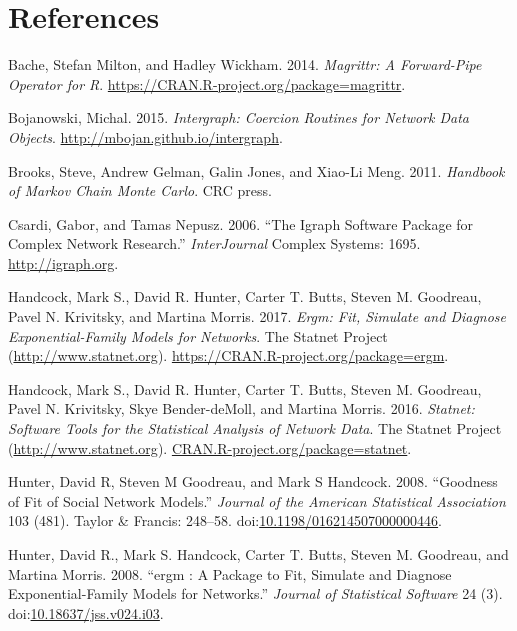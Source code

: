 \documentclass[]{book}
\theoremstyle{definition}
\theoremstyle{definition}
\theoremstyle{definition}
\theoremstyle{remark}
\begin{document}


\chapter*{References}\label{references}

\hypertarget{refs}{}
\hypertarget{ref-R-magrittr}{}
Bache, Stefan Milton, and Hadley Wickham. 2014. \emph{Magrittr: A
Forward-Pipe Operator for R}.
\url{https://CRAN.R-project.org/package=magrittr}.

\hypertarget{ref-R-intergraph}{}
Bojanowski, Michal. 2015. \emph{Intergraph: Coercion Routines for
Network Data Objects}. \url{http://mbojan.github.io/intergraph}.

\hypertarget{ref-brooks2011}{}
Brooks, Steve, Andrew Gelman, Galin Jones, and Xiao-Li Meng. 2011.
\emph{Handbook of Markov Chain Monte Carlo}. CRC press.

\hypertarget{ref-R-igraph}{}
Csardi, Gabor, and Tamas Nepusz. 2006. ``The Igraph Software Package for
Complex Network Research.'' \emph{InterJournal} Complex Systems: 1695.
\url{http://igraph.org}.

\hypertarget{ref-R-ergm}{}
Handcock, Mark S., David R. Hunter, Carter T. Butts, Steven M. Goodreau,
Pavel N. Krivitsky, and Martina Morris. 2017. \emph{Ergm: Fit, Simulate
and Diagnose Exponential-Family Models for Networks}. The Statnet
Project (\url{http://www.statnet.org}).
\url{https://CRAN.R-project.org/package=ergm}.

\hypertarget{ref-R-statnet}{}
Handcock, Mark S., David R. Hunter, Carter T. Butts, Steven M. Goodreau,
Pavel N. Krivitsky, Skye Bender-deMoll, and Martina Morris. 2016.
\emph{Statnet: Software Tools for the Statistical Analysis of Network
Data}. The Statnet Project (\url{http://www.statnet.org}).
\url{CRAN.R-project.org/package=statnet}.

\hypertarget{ref-HunterJASA2008}{}
Hunter, David R, Steven M Goodreau, and Mark S Handcock. 2008.
``Goodness of Fit of Social Network Models.'' \emph{Journal of the
American Statistical Association} 103 (481). Taylor \& Francis: 248--58.
doi:\href{https://doi.org/10.1198/016214507000000446}{10.1198/016214507000000446}.

\hypertarget{ref-Hunter2008}{}
Hunter, David R., Mark S. Handcock, Carter T. Butts, Steven M. Goodreau,
and Martina Morris. 2008. ``ergm : A Package to Fit, Simulate and
Diagnose Exponential-Family Models for Networks.'' \emph{Journal of
Statistical Software} 24 (3).
doi:\href{https://doi.org/10.18637/jss.v024.i03}{10.18637/jss.v024.i03}.
\end{document}
